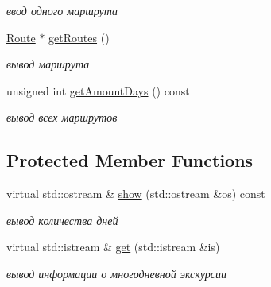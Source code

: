 \begin{DoxyCompactItemize}
\begin{DoxyCompactList}\small\item\em ввод одного маршрута \end{DoxyCompactList}\item 
\hypertarget{class_multiday_excursion_afb755ee592591f9b53f94b7febdc6169}{}\hyperlink{class_route}{Route} $\ast$ \hyperlink{class_multiday_excursion_afb755ee592591f9b53f94b7febdc6169}{get\+Routes} ()\label{class_multiday_excursion_afb755ee592591f9b53f94b7febdc6169}

\begin{DoxyCompactList}\small\item\em вывод маршрута \end{DoxyCompactList}\item 
\hypertarget{class_multiday_excursion_a93a69740a32cd61c790da4ab8eb08405}{}unsigned int \hyperlink{class_multiday_excursion_a93a69740a32cd61c790da4ab8eb08405}{get\+Amount\+Days} () const \label{class_multiday_excursion_a93a69740a32cd61c790da4ab8eb08405}

\begin{DoxyCompactList}\small\item\em вывод всех маршрутов \end{DoxyCompactList}\end{DoxyCompactItemize}
\subsection*{Protected Member Functions}
\begin{DoxyCompactItemize}
\item 
\hypertarget{class_multiday_excursion_a14615b65c63d94d098ea9d0632cd7a89}{}virtual std\+::ostream \& \hyperlink{class_multiday_excursion_a14615b65c63d94d098ea9d0632cd7a89}{show} (std\+::ostream \&os) const \label{class_multiday_excursion_a14615b65c63d94d098ea9d0632cd7a89}

\begin{DoxyCompactList}\small\item\em вывод количества дней \end{DoxyCompactList}\item 
\hypertarget{class_multiday_excursion_a6b76291f98f0a5e5cf16cca45fa40000}{}virtual std\+::istream \& \hyperlink{class_multiday_excursion_a6b76291f98f0a5e5cf16cca45fa40000}{get} (std\+::istream \&is)\label{class_multiday_excursion_a6b76291f98f0a5e5cf16cca45fa40000}

\begin{DoxyCompactList}\small\item\em вывод информации о многодневной экскурсии \end{DoxyCompactList}\end{DoxyCompactItemize}
